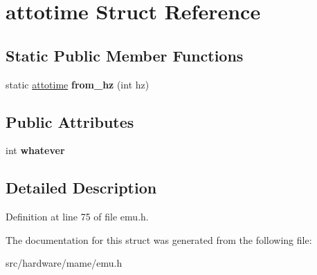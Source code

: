 \hypertarget{structattotime}{\section{attotime Struct Reference}
\label{structattotime}
}
\subsection*{Static Public Member Functions}
\begin{DoxyCompactItemize}
\item 
\hypertarget{structattotime_a79c6fbc999e30d5002d9d5a99676b287}{static \hyperlink{structattotime}{attotime} {\bfseries from\-\_\-hz} (int hz)}\label{structattotime_a79c6fbc999e30d5002d9d5a99676b287}

\end{DoxyCompactItemize}
\subsection*{Public Attributes}
\begin{DoxyCompactItemize}
\item 
\hypertarget{structattotime_a4aa7fd0f746f87097d28c1678e5f21b5}{int {\bfseries whatever}}\label{structattotime_a4aa7fd0f746f87097d28c1678e5f21b5}

\end{DoxyCompactItemize}


\subsection{Detailed Description}


Definition at line 75 of file emu.\-h.



The documentation for this struct was generated from the following file\-:\begin{DoxyCompactItemize}
\item 
src/hardware/mame/emu.\-h\end{DoxyCompactItemize}

